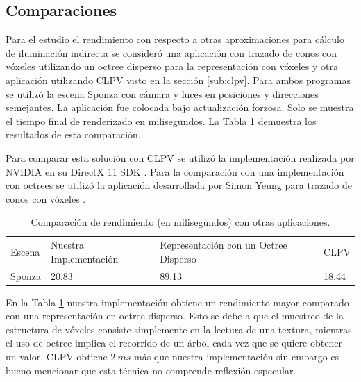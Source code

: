 \subsection{Comparaciones} %
\label{sub:comparasiones}
Para el estudio el rendimiento con respecto a otras aproximaciones para cálculo de iluminación indirecta se consideró una aplicación con trazado de conos con vóxeles utilizando un octree disperso para la representación con vóxeles y otra aplicación utilizando \ac{CLPV} visto en la sección \ref{sub:clpv}. Para ambos programas se utilizó la escena Sponza con cámara y luces en posiciones y direcciones semejantes. La aplicación fue colocada bajo actualización forzosa. Solo se muestra el tiempo final de renderizado en milisegundos. La Tabla \ref{tab:compare} demuestra los resultados de esta comparación.

Para comparar esta solución con \ac{CLPV} se utilizó la implementación realizada por NVIDIA en su DirectX 11 SDK \cite{nvidia_samples}. Para la comparación con una implementación con octrees se utilizó la aplicación desarrollada por Simon Yeung para trazado de conos con vóxeles \cite{vct_sample}.

\begin{table}[h]
\centering
\begin{tabular}{llll}
                             &                                             &                                  &                            \\ \hline
\multicolumn{1}{|l|}{Escena} & \multicolumn{1}{l|}{Nuestra Implementación} & \multicolumn{1}{l|}{Representación con un Octree Disperso} & \multicolumn{1}{l|}{CLPV}  \\ \hline
\multicolumn{1}{|l|}{Sponza} & \multicolumn{1}{l|}{20.83}                  & \multicolumn{1}{l|}{89.13}      & \multicolumn{1}{l|}{18.44} \\ \hline
\end{tabular}
\caption{Comparación de rendimiento (en milisegundos) con otras aplicaciones.}
\label{tab:compare}
\end{table}

En la Tabla \ref{tab:compare} nuestra implementación obtiene un rendimiento mayor comparado con una representación en octree disperso. Esto se debe a que el muestreo de la estructura de vóxeles consiste simplemente en la lectura de una textura, mientras el uso de octree implica el recorrido de un árbol cada vez que se quiere obtener un valor. \ac{CLPV} obtiene $2\ ms$ más que nuestra implementación sin embargo es bueno mencionar que esta técnica no comprende reflexión especular.

